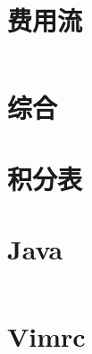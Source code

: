 \documentclass[titlepage,landscape,a4paper,10pt]{article}
\begin{document}
\begin{multicols}{2}
\begin{spacing}{0.8}
\section{费用流}
\inputminted{cpp}{improve/MincostFlow.cpp}

\section{综合}






\end{spacing}
\end{multicols}
\section{积分表}



\begin{multicols}{2}
\begin{spacing}{0.8}


\section{Java}
\inputminted{java}{src/Main.java}

\section{Vimrc}
\inputminted{text}{src/vimrc.vim}
\end{spacing}

\end{multicols}
\end{document}
